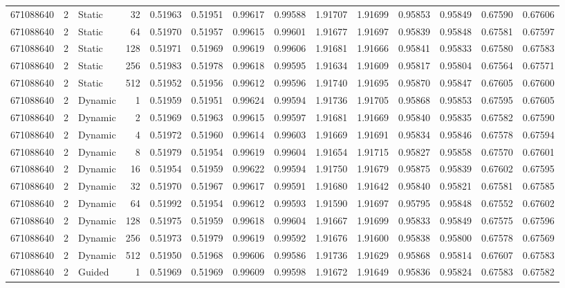 \begin{tabular}{rrlrrrrrrrrrrr}
671088640 & 2 & Static & 32 & 0.51963 & 0.51951 & 0.99617 & 0.99588 & 1.91707 & 1.91699 & 0.95853 & 0.95849 & 0.67590 & 0.67606 \\
671088640 & 2 & Static & 64 & 0.51970 & 0.51957 & 0.99615 & 0.99601 & 1.91677 & 1.91697 & 0.95839 & 0.95848 & 0.67581 & 0.67597 \\
671088640 & 2 & Static & 128 & 0.51971 & 0.51969 & 0.99619 & 0.99606 & 1.91681 & 1.91666 & 0.95841 & 0.95833 & 0.67580 & 0.67583 \\
671088640 & 2 & Static & 256 & 0.51983 & 0.51978 & 0.99618 & 0.99595 & 1.91634 & 1.91609 & 0.95817 & 0.95804 & 0.67564 & 0.67571 \\
671088640 & 2 & Static & 512 & 0.51952 & 0.51956 & 0.99612 & 0.99596 & 1.91740 & 1.91695 & 0.95870 & 0.95847 & 0.67605 & 0.67600 \\
671088640 & 2 & Dynamic & 1 & 0.51959 & 0.51951 & 0.99624 & 0.99594 & 1.91736 & 1.91705 & 0.95868 & 0.95853 & 0.67595 & 0.67605 \\
671088640 & 2 & Dynamic & 2 & 0.51969 & 0.51963 & 0.99615 & 0.99597 & 1.91681 & 1.91669 & 0.95840 & 0.95835 & 0.67582 & 0.67590 \\
671088640 & 2 & Dynamic & 4 & 0.51972 & 0.51960 & 0.99614 & 0.99603 & 1.91669 & 1.91691 & 0.95834 & 0.95846 & 0.67578 & 0.67594 \\
671088640 & 2 & Dynamic & 8 & 0.51979 & 0.51954 & 0.99619 & 0.99604 & 1.91654 & 1.91715 & 0.95827 & 0.95858 & 0.67570 & 0.67601 \\
671088640 & 2 & Dynamic & 16 & 0.51954 & 0.51959 & 0.99622 & 0.99594 & 1.91750 & 1.91679 & 0.95875 & 0.95839 & 0.67602 & 0.67595 \\
671088640 & 2 & Dynamic & 32 & 0.51970 & 0.51967 & 0.99617 & 0.99591 & 1.91680 & 1.91642 & 0.95840 & 0.95821 & 0.67581 & 0.67585 \\
671088640 & 2 & Dynamic & 64 & 0.51992 & 0.51954 & 0.99612 & 0.99593 & 1.91590 & 1.91697 & 0.95795 & 0.95848 & 0.67552 & 0.67602 \\
671088640 & 2 & Dynamic & 128 & 0.51975 & 0.51959 & 0.99618 & 0.99604 & 1.91667 & 1.91699 & 0.95833 & 0.95849 & 0.67575 & 0.67596 \\
671088640 & 2 & Dynamic & 256 & 0.51973 & 0.51979 & 0.99619 & 0.99592 & 1.91676 & 1.91600 & 0.95838 & 0.95800 & 0.67578 & 0.67569 \\
671088640 & 2 & Dynamic & 512 & 0.51950 & 0.51968 & 0.99606 & 0.99586 & 1.91736 & 1.91629 & 0.95868 & 0.95814 & 0.67607 & 0.67583 \\
671088640 & 2 & Guided & 1 & 0.51969 & 0.51969 & 0.99609 & 0.99598 & 1.91672 & 1.91649 & 0.95836 & 0.95824 & 0.67583 & 0.67582 \\

\end{tabular}
